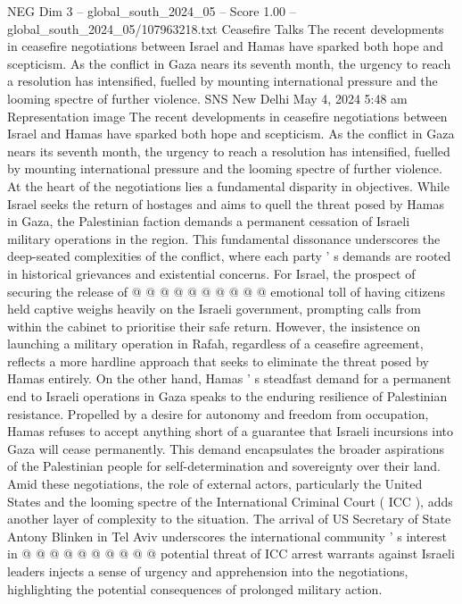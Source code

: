 \begin{textsample}{NEG Dim 3 – global\_south\_2024\_05 – Score 1.00 – global\_south\_2024\_05/107963218.txt}  \label{ex:f3_neg_356}
Ceasefire Talks The recent developments in ceasefire negotiations between Israel and Hamas have sparked both hope and scepticism.
As the conflict in Gaza nears its seventh month, the urgency to reach a resolution has intensified, fuelled by mounting international pressure and the looming spectre of further violence.
SNS New Delhi May 4, 2024 5:48 am Representation image The recent developments in ceasefire negotiations between Israel and Hamas have sparked both hope and scepticism.
As the conflict in Gaza nears its seventh month, the urgency to reach a resolution has intensified, fuelled by mounting international pressure and the looming spectre of further violence.
At the heart of the negotiations lies a fundamental disparity in objectives.
While Israel seeks the return of hostages and aims to quell the threat posed by Hamas in Gaza, the Palestinian faction demands a permanent cessation of Israeli military operations in the region.
This fundamental dissonance underscores the deep-seated complexities of the conflict, where each party ' s demands are rooted in historical grievances and existential concerns.
For Israel, the prospect of securing the release of @ @ @ @ @ @ @ @ @ @ emotional toll of having citizens held captive weighs heavily on the Israeli government, prompting calls from within the cabinet to prioritise their safe return.
However, the insistence on launching a military operation in Rafah, regardless of a ceasefire agreement, reflects a more hardline approach that seeks to eliminate the threat posed by Hamas entirely.
On the other hand, Hamas ' s steadfast demand for a permanent end to Israeli operations in Gaza speaks to the enduring resilience of Palestinian resistance.
Propelled by a desire for autonomy and freedom from occupation, Hamas refuses to accept anything short of a guarantee that Israeli incursions into Gaza will cease permanently.
This demand encapsulates the broader aspirations of the Palestinian people for self-determination and sovereignty over their land.
Amid these negotiations, the role of external actors, particularly the United States and the looming spectre of the International Criminal Court ( ICC ), adds another layer of complexity to the situation.
The arrival of US Secretary of State Antony Blinken in Tel Aviv underscores the international community ' s interest in @ @ @ @ @ @ @ @ @ @ potential threat of ICC arrest warrants against Israeli leaders injects a sense of urgency and apprehension into the negotiations, highlighting the potential consequences of prolonged military action.

\end{textsample}
